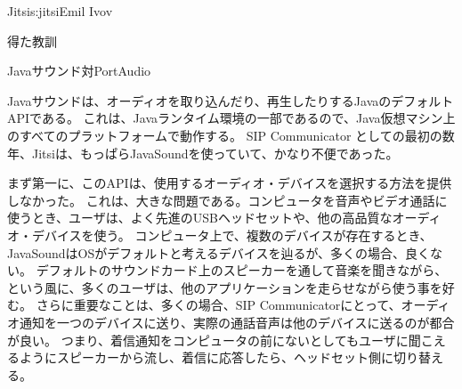\begin{aosachapter}{Jitsi}{s:jitsi}{Emil Ivov}
\begin{aosasect1}{得た教訓}
\begin{aosasect2}{Javaサウンド対PortAudio}

Javaサウンドは、オーディオを取り込んだり、再生したりするJavaのデフォルトAPIである。
これは、Javaランタイム環境の一部であるので、Java仮想マシン上のすべてのプラットフォームで動作する。
SIP Communicator としての最初の数年、Jitsiは、もっぱらJavaSoundを使っていて、かなり不便であった。

まず第一に、このAPIは、使用するオーディオ・デバイスを選択する方法を提供しなかった。
これは、大きな問題である。コンピュータを音声やビデオ通話に使うとき、ユーザは、よく先進のUSBヘッドセットや、他の高品質なオーディオ・デバイスを使う。
コンピュータ上で、複数のデバイスが存在するとき、JavaSoundはOSがデフォルトと考えるデバイスを辿るが、多くの場合、良くない。
デフォルトのサウンドカード上のスピーカーを通して音楽を聞きながら、という風に、多くのユーザは、他のアプリケーションを走らせながら使う事を好む。
さらに重要なことは、多くの場合、SIP Communicatorにとって、オーディオ通知を一つのデバイスに送り、実際の通話音声は他のデバイスに送るのが都合が良い。
つまり、着信通知をコンピュータの前にないとしてもユーザに聞こえるようにスピーカーから流し、着信に応答したら、ヘッドセット側に切り替える。


\end{aosasect2}
\end{aosasect1}
\end{aosachapter}
